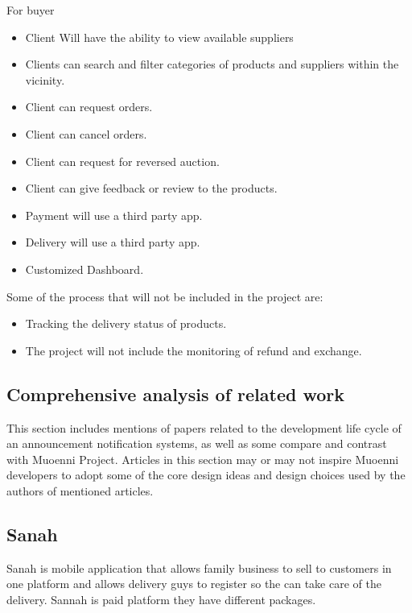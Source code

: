 \documentclass[11pt]{article}
\newcommand\tab[1][1cm]{\hspace*{#1}}
\begin{document}
For buyer 

\begin{itemize}
\item Client Will have the ability to view available suppliers
\item Clients can search and filter categories of products and suppliers within the vicinity.
\item Client can request orders.
\item Client can cancel orders.
\item Client can request for reversed auction.
\item Client can give feedback or review to the products.
\item Payment will use a third party app.
\item Delivery will use a third party app.
\item Customized Dashboard.

\end{itemize}

Some of the process that will not be included in the project are:

\begin{itemize}
\item Tracking the delivery status of products. 
\item  The project will not include the monitoring of refund and exchange.
\end{itemize}

\begin{center}
\section{Comprehensive analysis of related work}
\end{center}

\tab This section includes mentions of papers related to the development life cycle of an announcement notification systems, as well as some compare and contrast with Muoenni Project. Articles in this section may or may not inspire Muoenni developers to adopt some of the core design ideas and design choices used by the authors of mentioned articles.

\subsection{Sanah}
\tab  Sanah is mobile application that allows family business to sell to customers in one platform and allows delivery guys to register so the can take care of the delivery. Sannah is paid platform they have different packages.
\end{document}
